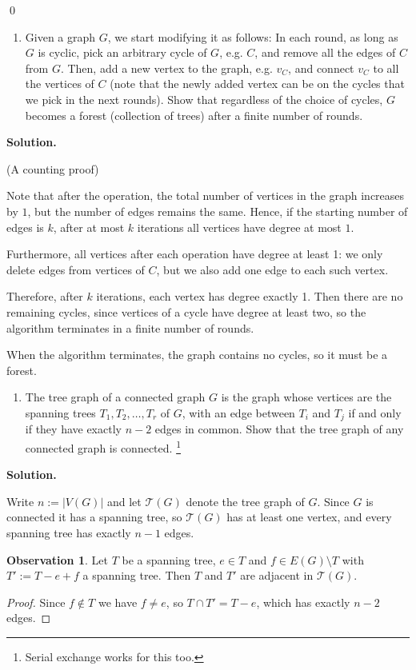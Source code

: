 \documentclass[11pt,letterpaper]{article}
\theoremstyle{definition}
\newtheorem{observation}[theorem]{Observation}
\newcommand{\calT}{\mathcal{T}}
\newcommand{\solution}{\medskip\noindent\textbf{Solution.}\par\medskip}
\begin{document}
\qed

\begin{enumerate}[resume=q]
\item Given a graph $G$, we start modifying it as follows: In each round, as long as $G$ is cyclic, pick an arbitrary cycle of $G$, e.g. $C$, and remove all the edges of $C$ from $G$. Then, add a new vertex to the graph, e.g. $v_C$, and connect $v_C$ to all the vertices of $C$ (note that the newly added vertex can be on the cycles that we pick in the next rounds). Show that regardless of the choice of cycles, $G$ becomes a forest (collection of trees) after a finite number of rounds.
\end{enumerate}

\solution
(A counting proof)

Note that after the operation, the total number of vertices in the graph increases by $1$, but the number of edges remains the same. 
Hence, if the starting number of edges is $k$, after at most $k$ iterations all vertices have degree at most $1$. 

Furthermore, all vertices after each operation have degree at least 1: we only delete edges from vertices of $C$, but we also add one edge to each such vertex.

Therefore, after $k$ iterations, each vertex has degree exactly 1.
Then there are no remaining cycles, since vertices of a cycle have degree at least two, so the algorithm terminates in a finite number of rounds.

When the algorithm terminates, the graph contains no cycles, so it must be a forest.


\begin{enumerate}[resume=q]
\item The tree graph of a connected graph $G$ is the graph whose vertices are the spanning trees $T_1, T_2, \ldots, T_r$ of $G$, with an edge between $T_i$ and $T_j$ if and only if they have exactly $n-2$ edges in common. Show that the tree graph of any connected graph is connected.
\footnote{Serial exchange works for this too.}
\end{enumerate}

\solution
Write $n:=|V(G)|$ and let $\calT(G)$ denote the tree graph of $G$.
Since $G$ is connected it has a spanning tree, so $\calT(G)$ has at least one vertex, and every spanning tree has exactly $n-1$ edges.

\begin{observation}\label{obs:swap-is-edge}
    Let $T$ be a spanning tree, $e\in T$ and $f\in E(G)\setminus T$ with $T':=T-e+f$ a spanning tree.
    Then $T$ and $T'$ are adjacent in $\calT(G)$.
\end{observation}
\begin{proof}
    Since $f\notin T$ we have $f\neq e$, so $T\cap T' = T-e$, which has exactly $n-2$ edges.
\end{proof}
\end{document}
